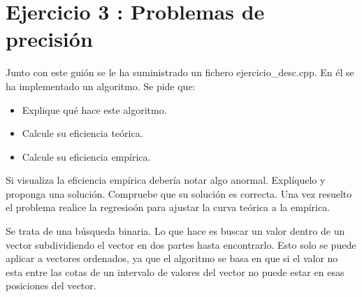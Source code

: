 \documentclass{article}
\begin{document}
\clearpage
\section{Ejercicio 3 : Problemas de precisión}
Junto con este guión se le ha suministrado un fichero ejercicio\_desc.cpp. En él se ha implementado un algoritmo. Se pide que:
\begin{itemize}
	\item Explique qué hace este algoritmo.
	\item Calcule su eficiencia teórica.
	\item Calcule su eficiencia empírica.
\end{itemize}
Si visualiza la eficiencia empírica debería notar algo anormal. Explíquelo y proponga una solución. Compruebe que su solución es correcta. Una vez resuelto el problema realice la regresioón para ajustar la curva teórica a la empírica.
\clearpage


Se trata de una búsqueda binaria. Lo que hace es buscar un valor dentro de un vector subdividiendo el vector en dos partes hasta encontrarlo. Esto solo se puede aplicar a vectores ordenados, ya que el algoritmo se basa en que si el valor no esta entre las cotas de un intervalo de valores del vector no puede estar en esas posiciones del vector. \\ \\
\end{document}
